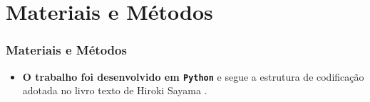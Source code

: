 
\section{Materiais e Métodos}

\begin{frame}
  \frametitle{Materiais e Métodos}

  \begin{alertblock}{}
    \vspace{5mm}

    \begin{itemize}
      \item \alert{\textbf{O trabalho foi desenvolvido em \texttt{Python}}} e
        segue a estrutura de codificação adotada no livro texto de Hiroki Sayama
        \cite{Sayama:2015:ComplexSystems}.
      \vspace{5mm}

    \end{itemize}
  \end{alertblock}
\end{frame}
